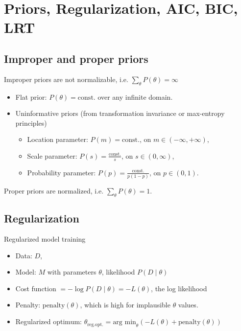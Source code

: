 \newpage
\section{Priors, Regularization, AIC, BIC, LRT}


\subsection{Improper and proper priors}
\no Improper priors are not normalizable, i.e. $\sum_\theta P(\theta) = \infty$
\begin{itemize}
	\item Flat prior: $P(\theta) = \text{const.}$ over any infinite domain.
	\item Uninformative priors (from transformation invariance or max-entropy principles)
	\begin{itemize}
		\item Location parameter: $P(m) = \text{const.}$, on $m \in (-\infty, +\infty)$,
		\item Scale parameter: $P(s) = \frac{\text{const.}}{s}$, on $s\in (0, \infty)$,
		\item Probability parameter: $P(p) = \frac{\text{const.}}{p(1-p)}$, on $p\in(0,1)$.
	\end{itemize}
\end{itemize}
Proper priors are normalized, i.e. $\sum_\theta P(\theta) = 1$.

\subsection{Regularization}
\no Regularized model training
\begin{itemize}
	\item Data: $D$, 
	\item Model: $M$ with parameters $\theta$, likelihood $P(D\;|\;\theta)$
	\item Cost function $= - \log P(D\;|\;\theta) = - L(\theta)$, the log likelihood
	\item Penalty: $\text{penalty}(\theta)$, which is high for implausible $\theta$ values.
	\item Regularized optimum: $\theta_\text{reg.opt.} = \text{arg min}_\theta (-L(\theta) + \text{penalty}(\theta))$
\end{itemize}

